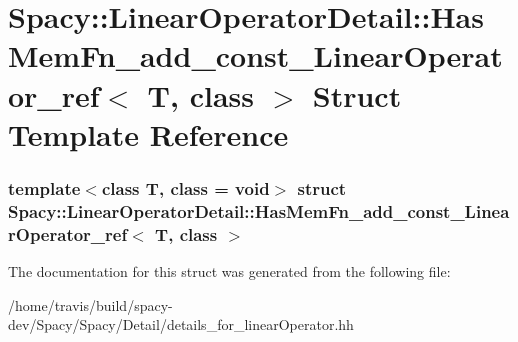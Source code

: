 \hypertarget{structSpacy_1_1LinearOperatorDetail_1_1HasMemFn__add__const__LinearOperator__ref}{\section{\-Spacy\-:\-:\-Linear\-Operator\-Detail\-:\-:\-Has\-Mem\-Fn\-\_\-add\-\_\-const\-\_\-\-Linear\-Operator\-\_\-ref$<$ \-T, class $>$ \-Struct \-Template \-Reference}
\label{structSpacy_1_1LinearOperatorDetail_1_1HasMemFn__add__const__LinearOperator__ref}
}
\subsubsection*{template$<$class T, class = void$>$ struct Spacy\-::\-Linear\-Operator\-Detail\-::\-Has\-Mem\-Fn\-\_\-add\-\_\-const\-\_\-\-Linear\-Operator\-\_\-ref$<$ T, class $>$}



\-The documentation for this struct was generated from the following file\-:\begin{DoxyCompactItemize}
\item 
/home/travis/build/spacy-\/dev/\-Spacy/\-Spacy/\-Detail/details\-\_\-for\-\_\-linear\-Operator.\-hh\end{DoxyCompactItemize}
